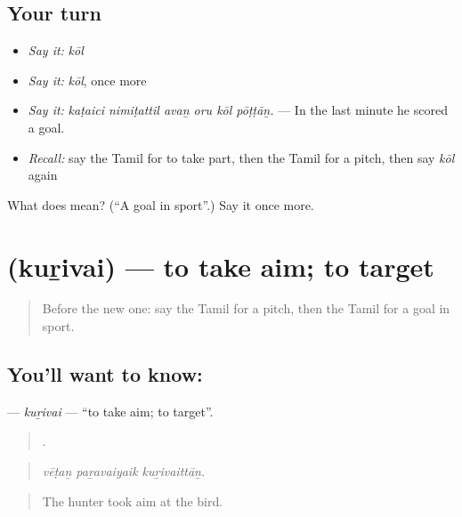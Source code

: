 \subsection*{Your turn}
\begin{itemize}
\raggedright
  \item \emph{Say it:} \emph{kōl}
  \item \emph{Say it:} \emph{kōl}, once more
  \item \emph{Say it:} \emph{kaṭaici nimiṭattil avaṉ oru kōl pōṭṭāṉ.} — In the last minute he scored a goal.
  \item \emph{Recall:} say the Tamil for to take part, then the Tamil for a pitch, then say \emph{kōl} again
\end{itemize}

\begin{tcolorbox}[breakable,colback=teal!4,colframe=teal!35!black,title={Before you move on}]
What does  mean? (\textquotedblleft{}A goal in sport\textquotedblright{}.) Say it once more.
\end{tcolorbox}
\section[\texorpdfstring{\ta{குறிவை} (kuṟivai)}{குறிவை (kuṟivai)}]{ (kuṟivai) — to take aim; to target}

\label{lesson:TA-C535-kurivai}



\begin{quote}
Before the new one: say the Tamil for a pitch, then the Tamil for a goal in sport.
\end{quote}

\subsection*{You'll want to know: }
\textbf{} — \emph{kuṟivai} — \textquotedblleft{}to take aim; to target\textquotedblright{}.

\begin{quote}
  .
\end{quote}

\begin{quote}
\emph{vēṭaṉ paṟavaiyaik kuṟivaittāṉ.}
\end{quote}

\begin{quote}
The hunter took aim at the bird.
\end{quote}

